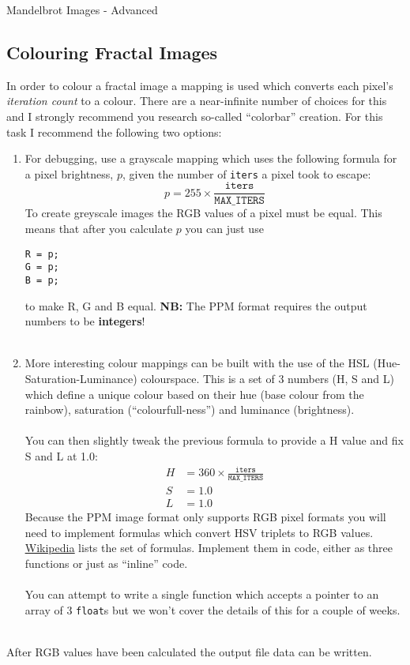 \documentclass{lab}
\begin{document}
\begin{task}{Mandelbrot Images - Advanced}{}
\subsection*{Colouring Fractal Images}
In order to colour a fractal image a mapping is used which converts each pixel's \textit{iteration count} to a colour. There are a near-infinite number of choices for this and I strongly recommend you research so-called ``colorbar'' creation. For this task I recommend the following two options:
\begin{enumerate}
	\item For debugging, use a grayscale mapping which uses the following formula for a pixel brightness, $p$, given the number of \texttt{iters} a pixel took to escape:
		\begin{equation*}
			p = 255 \times \frac{\texttt{iters}}{\texttt{MAX\_ITERS}}
		\end{equation*}
		To create greyscale images the RGB values of a pixel must be equal. This means that after you calculate $p$ you can just use 
\begin{lstlisting}[style=pseudo]
R = p;
G = p;
B = p; 
\end{lstlisting}

to make R, G and B equal. \textbf{NB:} The PPM format requires the output numbers to be \textbf{integers}!\\~
	\item More interesting colour mappings can be built with the use of the HSL (Hue-Saturation-Luminance) colourspace. This is a set of 3 numbers (H, S and L) which define a unique colour based on their hue (base colour from the rainbow), saturation (``colourfull-ness'') and luminance (brightness). 
\\~\\
You can then slightly tweak the previous formula to provide a H value and fix S and L at 1.0:
\begin{align*}
H &= 360 \times \frac{\texttt{iters}}{\texttt{MAX\_ITERS}}\\
S &= 1.0\\
L &= 1.0
\end{align*}
Because the PPM image format only supports RGB pixel formats you will need to implement formulas which convert HSV triplets to RGB values. \underline{\href{https://www.rapidtables.com/convert/color/hsv-to-rgb.html}{Wikipedia}} lists the set of formulas. Implement them in code, either as three functions or just as ``inline'' code.
\\~\\
You can attempt to write a single function which accepts a pointer to an array of 3 \texttt{float}s but we won't cover the details of this for a couple of weeks.
\end{enumerate}
~\\
After RGB values have been calculated the output file data can be written.


\end{task}
\end{document}
